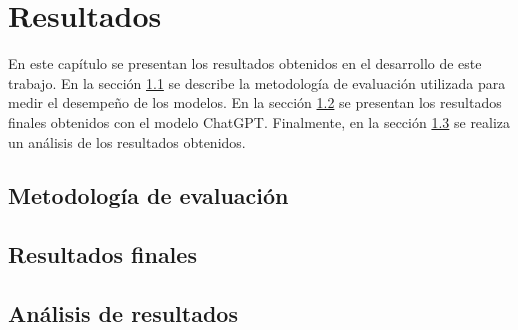 \chapter{Resultados}
\label{cap:resultados}


En este capítulo se presentan los resultados obtenidos en el desarrollo de este trabajo. 
En la sección \ref{sec:evaluacion} se describe la metodología de evaluación utilizada 
para medir el desempeño de los modelos. En la sección \ref{sec:resultados_finales} se
presentan los resultados finales obtenidos con el modelo ChatGPT. Finalmente, en la
sección \ref{sec:analisis_resultados} se realiza un análisis de los resultados obtenidos.

\section{Metodología de evaluación}
\label{sec:evaluacion}

\section{Resultados finales}
\label{sec:resultados_finales}

\section{Análisis de resultados}
\label{sec:analisis_resultados}